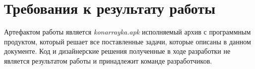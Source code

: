 \section{Требования к результату работы}

Артефактом работы является \emph{konarrayka.apk} исполняемый архив с программным продуктом, который решает все поставленные задачи, которые описаны в данном документе. Код и дизайнерские решения полученные в ходе разработки не является результатом работы и принадлежит команде разработчиков.
